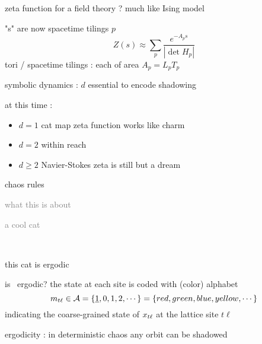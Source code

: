 \begin{frame}{zeta function for a field theory ? much like Ising model}
\begin{block}{"\po s" are now spacetime tilings $p$}
\[
Z(s) \approx
\sum_{p} \frac{e^{-A_p s}}
              {\left|\det H_p\right|}
\]
tori / spacetime tilings :
each of area $A_p = L_p T_p$
\end{block}
\begin{block}{symbolic dynamics : $d$\dmn}
essential to encode shadowing
\end{block}

\vfill
at this time :
\begin{itemize}
\item $d=1$ cat map zeta function works like charm
\item $d=2$ {\catlatt} within reach
\item $d\geq2$ Navier-Stokes  zeta is still but a dream
\end{itemize}
\end{frame}

\begin{frame}{chaos rules}
\begin{enumerate}
              \item \textcolor{gray}{\small
what this is about
              \item
a cool cat
              \item
\catlatt\
                  } {\Large
              \item
this cat is ergodic
                    }
            \end{enumerate}
\end{frame}

\begin{frame}{is \catlatt\ ergodic?}
the state at each site
is coded with (color) alphabet
\[\Ssym{t\ell} \in \A=\{\underline{1},0,1,2,\cdots\}=
\{%
{\color{red}red},
{\color{green}green},
{\color{blue}blue},
{\color{yellow}yellow},\cdots%
\}
\]
indicating the coarse-grained state of $x_{t\ell}$ at the lattice site $t\ell$

\vfill

ergodicity : in deterministic chaos any orbit can be shadowed
\end{frame}

